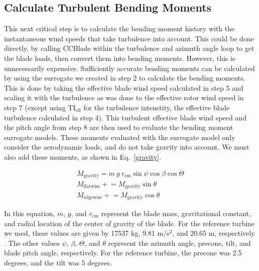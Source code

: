 \documentclass[11pt,letterpaper]{article}
\begin{document}
\subsection{Calculate Turbulent Bending Moments}
This next critical step is to calculate the bending moment history with the instantaneous wind speeds that take turbulence into account. This could be done directly, by calling CCBlade within the turbulence and azimuth angle loop to get the blade loads, then convert them into bending moments. However, this is unnecessarily expensive. Sufficiently accurate bending moments can be calculated by using the surrogate we created in step 2 to calculate the bending moments. This is done by taking the effective blade wind speed calculated in step 5 and scaling it with the turbulence as was done to the effective rotor wind speed in step 7 (except using $\text{TI}_{\text{eff}}$ for the turbulence intenstity, the effective blade turbulence calculated in step 4). This turbulent effective blade wind speed and the pitch angle from step 8 are then used to evaluate the bending moment surrogate models.
% 
These moments evaluated with the surrogate model only consider the aerodynamic loads, and do not take gravity into account. We must also add these moments, as shown in Eq.~\ref{gravity}.
   
    \begin{align}
        M_\text{gravity} = m~ g~ r_\text{cm} \sin{\psi} \cos{\beta}  \cos{\Theta} \nonumber\\
    M_\text{flatwise} \mathrel{+}= M_\text{gravity} \sin{\theta} \label{gravity} 
    \\
    M_\text{edgewise} \mathrel{+}= M_\text{gravity} \cos{\theta} \nonumber
    \end{align}
    
\noindent In this equation, $m$, $g$, and $r_\text{cm}$ represent the blade mass, gravitational constant, and radial location of the center of gravity of the blade. For the reference turbine we used, these values are given by 17537 kg, 9.81 m/s$^2$, and 20.65 m, respectively \cite{resor2013definition}. The other values $\psi$, $\beta$, $\Theta$, and $\theta$ represent the azimuth angle, precone, tilt, and blade pitch angle, respectively. For the reference turbine, the precone was 2.5 degrees, and the tilt was 5 degrees.

\end{document}
